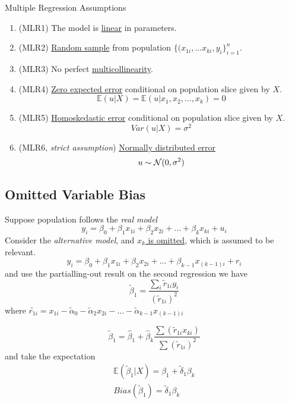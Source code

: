 \documentclass[]{article}
\begin{document}
    \begin{assumption}Multiple Regression Assumptions
        \begin{enumerate}
            \item (MLR1) The model is \ul{linear} in parameters. 
            \item (MLR2) \ul{Random sample} from population $\{(x_{1i}, \dots x_{ki}, y_i\}_{i=1}^n$.
            \item (MLR3) No perfect \ul{multicollinearity}.
            \item (MLR4) \ul{Zero expected error} conditional on population slice given by $X$.
            \[
                \mathbb{E}(u|X) = \mathbb{E}(u|x_1, x_2, \dots, x_k) = 0
            \]
            \item (MLR5) \ul{Homoskedastic error} conditional on population slice given by $X$.
            \[
                Var(u|X) = \sigma^2
            \]
            \item (MLR6, \emph{strict assumption}) \ul{Normally distributed error}
            \[
                u \sim \mathcal{{N}}(0, \sigma^2)
            \]
        \end{enumerate}
    \end{assumption}
    
    \subsection{Omitted Variable Bias}
    \par Suppose population follows the \emph{real model} 
    \begin{equation}
        y_i = \beta_0 + \beta_1 x_{1i} + \beta_2 x_{2i} + \dots + \beta_k x_{ki} + u_i
    \end{equation}
    Consider the \emph{alternative model}, and \ul{$x_k$ is omitted}, which is assumed to be relevant.
    \begin{equation}
        y_i = \beta_0 + \beta_1 x_{1i} + \beta_2 x_{2i} + \dots + \beta_{k-1} x_{(k-1)i} + r_i
    \end{equation}
    and use the partialling-out result on the second regression we have
    \[
        \tilde{\beta}_1 = \frac{\sum_i \tilde{r}_{1i} y_i}{( \tilde{r}_{1i})^2}
    \]
    where $\tilde{r_{1i}} = x_{1i} - \tilde{\alpha}_0 - \tilde{\alpha}_2 x_{2i} - \dots - \tilde{\alpha}_{k-1}x_{(k-1)i}$
    
    
    \begin{equation}
        \tilde{\beta}_1 = \hat{\beta}_1 + \hat{\beta}_k \frac{\sum (\tilde{r}_{1i} x_{ki})}{\sum (\tilde{r}_{1i})^2}
    \end{equation}
    and take the expectation 
    \begin{gather*}
        \mathbb{E}(\tilde{\beta}_1 | X) = \beta_1 + \tilde{\delta}_1 \beta_k \\
        Bias(\tilde{\beta}_1) = \tilde{\delta}_1 \beta_k
    \end{gather*}
\end{document}
